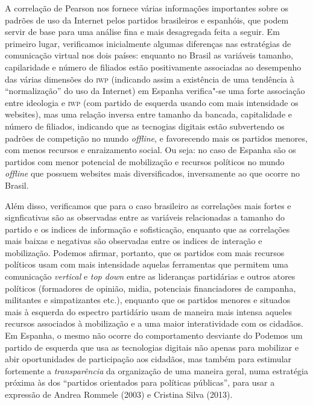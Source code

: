 A correlação de Pearson nos fornece várias informações
importantes sobre os padrões de uso da Internet pelos partidos
brasileiros e espanhóis, que podem servir de base para uma análise fina
e mais desagregada feita a seguir. Em primeiro lugar, verificamos
inicialmente algumas diferenças nas estratégias de comunicação virtual
nos dois países: enquanto no Brasil as variáveis tamanho, capilaridade e
número de filiados estão positivamente associadas ao desempenho das
várias dimensões do \textsc{iwp} (indicando assim a existência de uma tendência à
``normalização'' do uso da Internet) em Espanha verifica"-se uma forte
associação entre ideologia e \textsc{iwp} (com partido de esquerda usando com
mais intensidade os websites), mas uma relação inversa entre tamanho da
bancada, capitalidade e número de filiados, indicando que as tecnogias
digitais estão subvertendo os padrões de competição no mundo \emph{offline}, e
favorecendo mais os partidos menores, com menos recursos e enraizamento
social. Ou seja: no caso de Espanha são os partidos com menor potencial
de mobilização e recursos políticos no mundo \emph{offline} que possuem
websites mais diversificados, inversamente ao que ocorre no Brasil.

Além disso, verificamos que para o caso brasileiro as correlações mais
fortes e signficativas são as observadas entre as variáveis relacionadas
a tamanho do partido e os indices de informação e sofisticação, enquanto
que as correlações mais baixas e negativas são observadas entre os
indices de interação e mobilização. Podemos afirmar, portanto, que os
partidos com mais recursos políticos usam com mais intensidade aquelas
ferramentas que permitem uma comunicação \textit{vertical} e \textit{top down} entre
as lideranças partidárias e outros atores políticos (formadores de
opinião, midia, potenciais financiadores de campanha, militantes e
simpatizantes etc.), enquanto que os partidos menores e situados mais à
esquerda do espectro partidário usam de maneira mais intensa aqueles
recursos associados à mobilização e a uma maior interatividade com os
cidadãos. Em Espanha, o mesmo não ocorre do comportamento desviante do
Podemos um partido de esquerda que usa as tecnologias digitais
não apenas para mobilizar e abir oportunidades de participação aos
cidadãos, mas também para estimular fortemente a \emph{transparência} da
organização de uma maneira geral, numa estratégia próxima às dos
``partidos orientados para políticas públicas'', para usar a expressão
de Andrea Rommele (2003) e Cristina Silva (2013).

